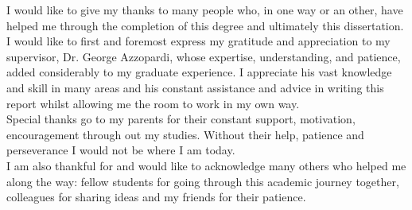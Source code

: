 \begin{acknowledgements}

I would like to give my thanks to many people who, in one way or an other, have helped me through the completion of this degree and ultimately this dissertation.\\

I would like to first and foremost express my gratitude and appreciation to my supervisor, Dr. George Azzopardi, whose expertise, understanding, and patience, added considerably to my graduate experience. I appreciate his vast knowledge and skill in many areas and his constant assistance and advice in writing this report whilst allowing me the room to work in my own way. \\

Special thanks go to my parents for their constant support, motivation, encouragement through out my studies. Without their help, patience and perseverance I would not be where I am today.\\

I am also thankful for and would like to acknowledge many others who helped me along the way: fellow students for going through this academic journey together, colleagues for sharing ideas and my friends for their patience.\\

\end{acknowledgements}
       